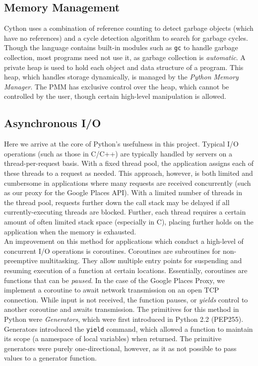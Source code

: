 \documentclass[letterpaper,twocolumn,10pt]{article}
\begin{document}
\subsection{Memory Management}

Cython uses a combination of reference counting to detect garbage objects (which have no references) and a cycle detection algorithm to search for garbage cycles. Though the language contains built-in modules such as \texttt{gc} to handle garbage collection, most programs need not use it, as garbage collection is \textit{automatic}. A private heap is used to hold each object and data structure of a program. This heap, which handles storage dynamically, is managed by the \textit{Python Memory Manager}. The PMM has exclusive control over the heap, which cannot be controlled by the user, though certain high-level manipulation is allowed.

\subsection{Asynchronous I/O}

Here we arrive at the core of Python's usefulness in this project. Typical I/O operations (such as those in C/C++) are typically handled by servers on a thread-per-request basis. With a fixed thread pool, the application assigns each of these threads to a request as needed. This approach, however, is both limited and cumbersome in applications where many requests are received concurrently (such as our proxy for the Google Places API). With a limited number of threads in the thread pool, requests further down the call stack may be delayed if all currently-executing threads are blocked. Further, each thread requires a certain amount of often limited stack space (especially in C), placing further holds on the application when the memory is exhausted.\\

An improvement on this method for applications which conduct a high-level of concurrent I/O operations is coroutines. Coroutines are subroutines for non-preemptive multitasking. They allow multiple entry points for suspending and resuming execution of a function at certain locations. Essentially, coroutines are functions that can be \textit{paused}. In the case of the Google Places Proxy, we implement a coroutine to await network transmission on an open TCP connection. While input is not received, the function pauses, or \textit{yields} control to another coroutine and awaits transmission. The primitives for this method in Python were \textit{Generators}, which were first introduced in Python 2.2 (PEP255). Generators introduced the \texttt{yield} command, which allowed a function to maintain its scope (a namespace of local variables) when returned. The primitive generators were purely one-directional, however, as it as not possible to pass values to a generator function. 
\end{document}
